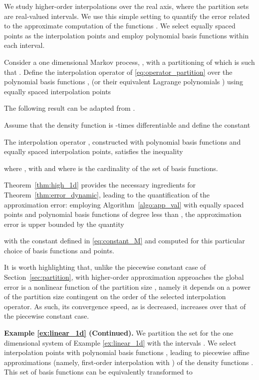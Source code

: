 \documentclass{LMCS}
\begin{document}
We study higher-order interpolations over the real axis, 
where the partition sets  are real-valued intervals. 
We use this simple setting to quantify the error related to the approximate computation of the functions .
We select equally spaced points as the interpolation points and employ polynomial basis functions within each interval.

Consider a one dimensional Markov process, , with a partitioning of  which is such that . 
Define the interpolation operator  of \eqref{eq:operator_partition} over the polynomial basis functions ,  (or their equivalent Lagrange polynomials \cite{Mastroianni:2008:IPB:1502750})
using equally spaced interpolation points 

The following result can be adapted from \cite{Mastroianni:2008:IPB:1502750}. 
\begin{thm}
\label{thm:high_1d}
Assume that the density function  is -times differentiable and define the constant 

The interpolation operator , constructed with polynomial basis functions and equally spaced interpolation points, satisfies the inequality

where , 
with 
and where  is the cardinality of the set of basis functions.
\end{thm}
Theorem~\ref{thm:high_1d} provides the necessary ingredients for Theorem~\ref{thm:error_dynamic}, 
leading to the quantification of the approximation error: 
employing Algorithm~\ref{algo:app_val} with equally spaced points and
polynomial basis functions of degree less than ,
the approximation error is upper bounded by the quantity

with the constant  defined in \eqref{eq:constant_M} and computed for this particular choice of basis functions and points.

It is worth highlighting that, 
unlike the piecewise constant case of Section~\ref{sec:partition}, 
with higher-order approximation approaches the global error is a nonlinear function of the partition size , 
namely it depends on a power of the partition size contingent on the order of the selected interpolation operator. 
As such, its convergence speed, as  is decreased, increases over that of the piecewise constant case. 

\medskip

\noindent\textbf{Example \ref{ex:linear_1d} (Continued).} 
We partition the set  for the one dimensional system of Example \ref{ex:linear_1d} with the intervals .
We select interpolation points  with polynomial basis functions , 
leading to piecewise affine approximations (namely, first-order interpolation with ) of the density functions . 
This set of basis functions can be equivalently transformed to 
\end{document}
